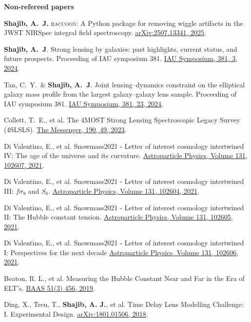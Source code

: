 \documentclass[margin, line]{res}
\begin{document}
\begin{resume}
\textbf{Non-refereed papers}
\begin{etaremune}
	\item \textbf{Shajib, A.~J.} \textsc{raccoon}: A Python package for removing wiggle artifacts in the JWST NIRSpec integral field spectroscopy. \href{https://ui.adsabs.harvard.edu/abs/2025arXiv250713341S/abstract}{arXiv:2507.13341, 2025}.
	\item \textbf{Shajib, A.~J}. Strong lensing by galaxies: past highlights, current status, and future prospects. Proceeding of IAU symposium 381. \href{https://ui.adsabs.harvard.edu/abs/2024IAUS..381....3S/abstract}{IAU Symposium, 381, 3, 2024}.
	\item Tan, C.~Y.\mentee~\& \textbf{Shajib, A.~J}. Joint lensing--dynamics constraint on the elliptical galaxy mass profile from the largest galaxy--galaxy lens sample. Proceeding of IAU symposium 381. \href{https://ui.adsabs.harvard.edu/abs/2024IAUS..381...23T/abstract}{IAU Symposium, 381, 23, 2024}.
	\item Collett, T.~E., et al. The 4MOST Strong Lensing Spectroscopic Legacy Survey (4SLSLS). \href{https://ui.adsabs.harvard.edu/abs/2023Msngr.190...49C/abstract}{The Messenger, 190, 49, 2023}.
	\item Di Valentino, E., et al. Snowmass2021 - Letter of interest cosmology intertwined IV: The age of the universe and its curvature. \href{https://www.sciencedirect.com/science/article/abs/pii/S0927650521000517}{Astroparticle Physics, Volume 131, 102607, 2021}.
	\item Di Valentino, E., et al. Snowmass2021 - Letter of interest cosmology intertwined III: $f\sigma_8$ and $S_8$. \href{https://www.sciencedirect.com/science/article/abs/pii/S0927650521000487}{Astroparticle Physics, Volume 131, 102604, 2021}.
	\item Di Valentino, E., et al. Snowmass2021 - Letter of interest cosmology intertwined II: The Hubble constant tension. \href{https://www.sciencedirect.com/science/article/abs/pii/S0927650521000499}{Astroparticle Physics, Volume 131, 102605, 2021}.
	\item Di Valentino, E., et al. Snowmass2021 - Letter of interest cosmology intertwined I: Perspectives for the next decade \href{https://www.sciencedirect.com/science/article/abs/pii/S0927650521000505}{Astroparticle Physics, Volume 131, 102606, 2021}.
	\item Beaton, R. L., et al. Measuring the Hubble Constant Near and Far in the Era of ELT's. \href{https://ui.adsabs.harvard.edu/abs/2019BAAS...51c.456B/abstract}{BAAS 51(3) 456, 	2019}.
	\item Ding, X., Treu, T., {\bf Shajib, A. J.}, et al. Time Delay Lens Modelling Challenge: I. Experimental Design. \href{https://arxiv.org/abs/1801.01506}{arXiv:1801.01506, 2018}.
\end{etaremune}


\end{resume}
\end{document}
